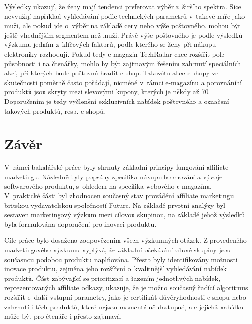 \documentclass[12pt,twoside,openany]{fithesis}
\makeatletter
\def\cleardoublepage{\clearpage\if@twoside \ifodd\c@page\else
        \thispagestyle{empty}
        \hbox{}\newpage\if@twocolumn\hbox{}\newpage\fi\fi\fi}
\makeatother
\begin{document}
                          Výsledky ukazují, že ženy mají tendenci 
preferovat výběr z~širšího spektra. Sice nevyužijí například 
vyhledávání podle technických parametrů v~takové míře jako muži, ale 
pokud jde o~výběr na základě ceny nebo výše poštovného, mohou být 
ještě vhodnějším segmentem než muži. Právě výše poštovného je 
podle výsledků výzkumu jedním z~klíčových faktorů, podle kterého se 
ženy při nákupu elektroniky rozhodují. Pokud tedy e-magazín TechRadar chce 
rozšířit pole působnosti i na čtenářky, mohlo by být zajímavým 
řešením zahrnutí speciálních akcí, při kterých bude poštovné hradit 
e-shop. Takovéto akce e-shopy ve skutečnosti poměrně často pořádají, 
nicméně v~rámci e-magazínu a porovnáníní produktů jsou skryty mezi 
slevovými kupony, kterých je někdy až 70. Doporučením je tedy 
vyčlenění exkluzivních nabídek poštovného a označení takových 
produktů, resp. e-shopů.

\cleardoublepage
{}
{}
\chapter*{Závěr}
\markright{\contentsname}



                          V~rámci bakalářské práce byly shrnuty základní 
principy fungování affiliate marketingu. Následně byly popsány specifika 
nákupního chování a vývoje softwarového produktu, s~ohledem na specifika 
webového e-magazínu. V~praktické části byl zhodnocen současný stav 
provádění affiliate marketingu britskou vydavatelskou společností Future. 
Na základě prvotní analýzy byl sestaven marketingový výzkum mezi cílovou 
skupinou, na základě jehož výsledků byla formulována doporučení pro 
inovaci produktu.

Cíle práce bylo dosaženo zodpovězením všech výzkumných otázek. Z provedeného marketingového
výzkumu vyplývá, že základní očekávání 
cílové skupiny jsou současnou podobou produktu naplňována. Přesto byly 
identifikovány možnosti inovace produktu, zejména jeho rozšíření 
o~kvalitnější vyhledávání nabídek produktů. Část zabývající se 
prioritizací a řazením jednotlivých nabídek, reprezentovaných affiliate 
odkazy, ukazuje, že je možno současný řadící algoritmus rozšířit 
o~další vstupní parametry, jako je certifikát důvěryhodnosti e-shopu nebo 
zahrnutí i těch produktů, které nejsou momentálně dostupné, ale jejichž 
nabídka může být pro čtenáře i přesto zajímavá.
\end{document}
